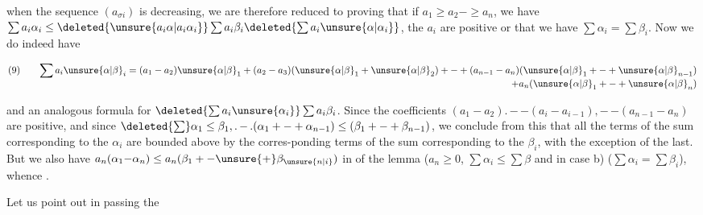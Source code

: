 
when the sequence $(a_{\sigma i})$ is decreasing, we are therefore   reduced to proving that if $a_1\geq a_2\mathord{-}\geq a_n$, we have $\sum a_i\alpha_i\leq\deleted{\unsure{a_i\alpha|a_i\alpha_i}}\sum a_i\beta_i\deleted{\sum a_i\unsure{\alpha|\alpha_i}}$,  the $a_i$ are positive  or that we have $\sum\alpha_i=\sum\beta_i$. Now we do indeed have

\[
\begin{array}{@{}l@{\qquad}l@{}}
(9)&\displaystyle\sum a_i\unsure{\alpha|\beta}_i=(a_1-a_2)\unsure{\alpha|\beta}_1+(a_2-a_3)(\unsure{\alpha|\beta}_1+\unsure{\alpha|\beta}_2)+\mathord{-}+(a_{n-1}-a_n)(\unsure{\alpha|\beta}_1+\mathord{-}+\unsure{\alpha|\beta}_{n-1})\\
&\displaystyle\hfill+a_n(\unsure{\alpha|\beta}_1+\mathord{-}+\unsure{\alpha|\beta}_n)
\end{array}
\]

 and an analogous formula for $\deleted{\sum a_i\unsure{\alpha_i}}\sum a_i\beta_i$. Since the coefficients $(a_1-a_2)\mathord{.}\,\mathord{-}\,\mathord{-}(a_i-a_{i-1}),\mathord{-}\,\mathord{-}(a_{n-1}-a_n)$ are positive,   and since $\deleted{\sum}\alpha_1\leq\beta_1,\mathord{.}\,\mathord{-}\,\mathord{.}(\alpha_1+\mathord{-}+\alpha_{n-1})\leq(\beta_1+\mathord{-}+\beta_{n-1})$, we conclude from this that all the terms of the sum corresponding to the $\alpha_i$ are bounded above by the corres-\newline ponding terms of the sum corresponding to the $\beta_i$, with the  exception of the last. But we also have $a_n(\alpha_1\mathord{-}\alpha_n)\leq a_n(\beta_1+\mathord{-}\unsure{+}\beta_{\unsure{n|i}})$ in  of the lemma ($a_n\geq0$, $\sum\alpha_i\leq\sum\beta$ and in case b) ($\sum\alpha_i=\sum\beta_i$), whence .

 Let us point out in passing the

{\reversemarginpar{}}
{\reversemarginpar{}}

